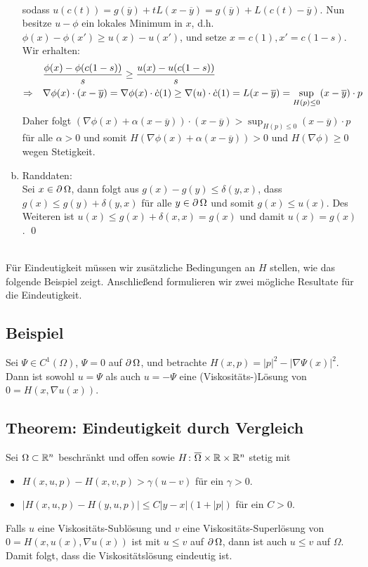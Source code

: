 \begin{enumerate}[a)]
\begin{equation}
\begin{aligned}
		\end{aligned}
		\end{equation}
		sodass $u(c(t)) = g(\overline{y}) + tL(x-\overline{y}) = g(\overline{y}) + L(c(t)-\overline{y})$. Nun besitze $u-\phi$ ein lokales Minimum in $x$, d.h. $\phi(x) - \phi(x') \geq u(x) - u(x')$, und setze $x=c(1), x'=c(1-s)$. Wir erhalten:
		\begin{equation}
		\begin{aligned}
			&\frac{\phi(x)-\phi(c(1-s))}{s} \geq \frac{u(x) - u(c(1-s))}{s} \\ \notag
			\Rightarrow \quad &\nabla \phi(x) \cdot (x-\overline{y}) = \nabla \phi(x) \cdot \dot{c}(1) \geq \nabla(u) \cdot \dot{c}(1) = L(x-\overline{y}) = \sup_{H(p) \leq 0} (x-\overline{y}) \cdot p
		\end{aligned}
		\end{equation}
		Daher folgt $(\nabla \phi(x) + \alpha(x-\overline{y})) \cdot (x-\overline{y}) > \sup_{H(p) \leq 0} (x-\overline{y})\cdot p$ für alle $\alpha > 0$ und somit $H(\nabla \phi(x) + \alpha(x- \overline{y})) > 0$ und $H(\nabla \phi) \geq 0$ wegen Stetigkeit.
		\item Randdaten: \\
		Sei $x \in \operatorname{\partial}\Omega$, dann folgt aus $g(x)-g(y) \leq \delta(y,x)$, dass $g(x) \leq g(y) + \delta(y,x)$ für alle $y \in \operatorname{\partial}\Omega$ und somit $g(x) \leq u(x)$. Des Weiteren ist $u(x) \leq g(x) + \delta(x,x) = g(x)$ und damit $u(x) = g(x)$. \qed
	\end{enumerate}

\mbox{} \\
Für Eindeutigkeit müssen wir zusätzliche Bedingungen an $H$ stellen, wie das folgende Beispiel zeigt. Anschließend formulieren wir zwei mögliche Resultate für die Eindeutigkeit.

\subsection{Beispiel}
\label{bsp_33}
	Sei $\Psi \in C^1(\Omega)$, $\Psi = 0$ auf $\operatorname{\partial}\Omega$,\marginnote{[33]} und betrachte $H(x,p) = |p|^2 - |\nabla \Psi(x)|^2$. Dann ist sowohl $u = \Psi$ als auch $u = -\Psi$ eine (Viskositäts-)Lösung von $0 = H(x,\nabla u (x))$.
	
\subsection{Theorem: Eindeutigkeit durch Vergleich}
\label{thm_34}
	Sei $\Omega \subset \mathbb{R}^n$ beschränkt \marginnote{[34]} und offen sowie $H\colon \overline{\Omega} \times \mathbb{R} \times \mathbb{R}^n$ stetig mit \begin{itemize}
		\item $H(x,u,p) - H(x,v,p) > \gamma(u-v)$ für ein $\gamma > 0$.
		\item $|H(x,u,p) - H(y,u,p)| \leq C|y-x|(1+|p|)$ für ein $C > 0$.
	\end{itemize}
	Falls $u$ eine Viskositäts-Sublösung und $v$ eine Viskositäts-Superlösung von $0 = H(x,u(x),\nabla u(x))$ ist mit $u \leq v$ auf $\operatorname{\partial} \Omega$, dann ist auch $u \leq v$ auf $\Omega$. Damit folgt, dass die Viskositätslösung eindeutig ist.
	
